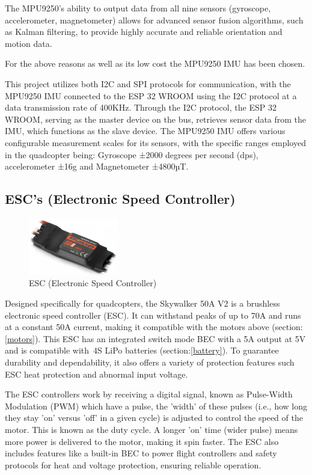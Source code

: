 \documentclass{article}
\begin{document}
The MPU9250's ability to output data from all nine sensors (gyroscope, accelerometer, magnetometer) allows for advanced sensor fusion algorithms, such as Kalman filtering, to provide highly accurate and reliable orientation and motion data.

For the above reasons as well as its low cost the MPU9250 IMU has been chosen.

This project utilizes both I2C and SPI protocols for communication, with the MPU9250 IMU connected to the ESP 32 WROOM using the I2C protocol at a data transmission rate of 400KHz. Through the I2C protocol, the ESP 32 WROOM, serving as the master device on the bus, retrieves sensor data from the IMU, which functions as the slave device. The MPU9250 IMU offers various configurable 
measurement scales for its sensors, with the specific ranges employed in the quadcopter being: Gyroscope ±2000 degrees per second (dps), accelerometer ±16g and Magnetometer ±4800µT.

\subsection{ESC's (Electronic Speed Controller)}\label{esc}
\begin{figure}[H]
  \centering
  \includegraphics[width=0.35\textwidth]{Pictures/esc.png}
  \caption{ESC (Electronic Speed Controller)}
  \label{fig:esc}
\end{figure}
Designed specifically for quadcopters, the Skywalker 50A V2 is a brushless electronic speed controller (ESC). It can withstand peaks of up to 70A and runs at a constant 50A current, making it compatible with the motors above (section:\ref{motors}). This ESC has an integrated switch mode BEC with a 5A output at 5V and is compatible with 4S LiPo 
batteries (section:\ref{battery}). To guarantee durability and dependability, it also offers a variety of protection features such ESC heat protection and abnormal input voltage.

The ESC controllers work by receiving a digital signal, known as Pulse-Width Modulation (PWM) which have a pulse, the ’width’ of these pulses (i.e., how long they stay ’on’ versus ’off’ in a given cycle) is adjusted to control the speed of the motor. This is known as the duty cycle.
A longer ’on’ time (wider pulse) means more power is delivered to the motor, making it spin faster. The ESC also includes features like a built-in BEC to power flight controllers and safety protocols for heat and voltage protection, ensuring reliable operation.
\end{document}
